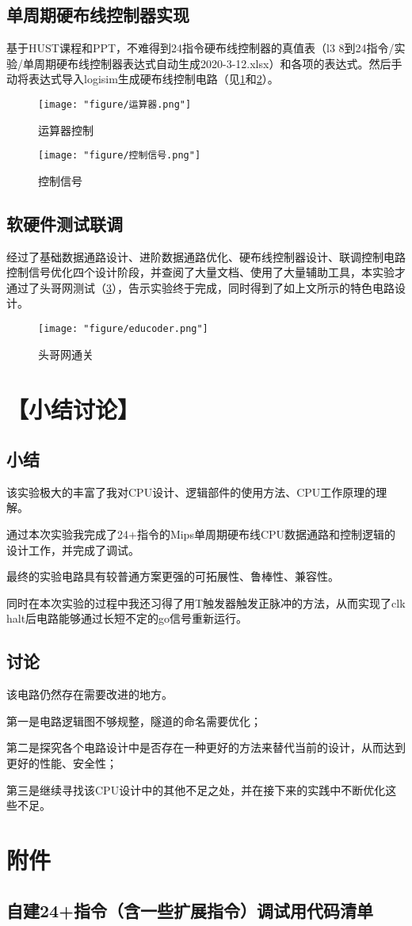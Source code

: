 \documentclass[withoutpreface]{cumcmthesis}
\begin{document}
\subsection{单周期硬布线控制器实现}
基于HUST课程和PPT，不难得到24指令硬布线控制器的真值表（l3 8到24指令/实验/单周期硬布线控制器表达式自动生成2020-3-12.xlsx）和各项的表达式。然后手动将表达式导入logisim生成硬布线控制电路（见\cref{fig:alus}和\cref{fig:ctrls}）。

\begin{figure}[!h]
	\centering
	\texttt{[image: "figure/运算器.png"]}
	\caption{运算器控制}
	\label{fig:alus}
\end{figure}

\begin{figure}[!h]
	\centering
	\texttt{[image: "figure/控制信号.png"]}
	\caption{控制信号}
	\label{fig:ctrls}
\end{figure}


\subsection{软硬件测试联调}
经过了基础数据通路设计、进阶数据通路优化、硬布线控制器设计、联调控制电路控制信号优化四个设计阶段，并查阅了大量文档、使用了大量辅助工具，本实验才通过了头哥网测试（\cref{fig:educoder}），告示实验终于完成，同时得到了如上文所示的特色电路设计。
\begin{figure}[!h]
	\centering
	\texttt{[image: "figure/educoder.png"]}
	\caption{头哥网通关}
	\label{fig:educoder}
\end{figure}
\section{【小结讨论】}
\subsection{小结}
该实验极大的丰富了我对CPU设计、逻辑部件的使用方法、CPU工作原理的理解。

通过本次实验我完成了24+指令的Mips单周期硬布线CPU数据通路和控制逻辑的设计工作，并完成了调试。

最终的实验电路具有较普通方案更强的可拓展性、鲁棒性、兼容性。

同时在本次实验的过程中我还习得了用T触发器触发正脉冲的方法，从而实现了clk halt后电路能够通过长短不定的go信号重新运行。
\subsection{讨论}
该电路仍然存在需要改进的地方。

第一是电路逻辑图不够规整，隧道的命名需要优化；

第二是探究各个电路设计中是否存在一种更好的方法来替代当前的设计，从而达到更好的性能、安全性；

第三是继续寻找该CPU设计中的其他不足之处，并在接下来的实践中不断优化这些不足。


\section{附件}
\subsection{自建24+指令（含一些扩展指令）调试用代码清单}

		
		\label{code:debug24}
\end{document}
